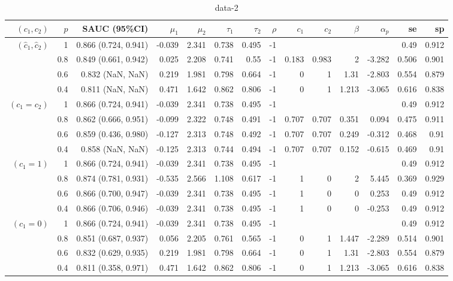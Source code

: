 \begin{table}

\caption{data-2}
\centering
\begin{tabular}[t]{rrrrrrrrrrrrrr}
\toprule
$(c_1, c_2)$ & $p$ & SAUC (95\%CI) & $\mu_1$ & $\mu_2$ & $\tau_1$ & $\tau_2$ & $\rho$ & $c_1$ & $c_2$ & $\beta$ & $\alpha_p$ & se & sp\\
\midrule
$(\hat{c}_1, \hat{c}_2)$ & 1 & 0.866 (0.724, 0.941) & -0.039 & 2.341 & 0.738 & 0.495 & -1 &  &  &  &  & 0.49 & 0.912\\
 & 0.8 & 0.849 (0.661, 0.942) & 0.025 & 2.208 & 0.741 & 0.55 & -1 & 0.183 & 0.983 & 2 & -3.282 & 0.506 & 0.901\\
 & 0.6 & 0.832 (NaN, NaN) & 0.219 & 1.981 & 0.798 & 0.664 & -1 & 0 & 1 & 1.31 & -2.803 & 0.554 & 0.879\\
 & 0.4 & 0.811 (NaN, NaN) & 0.471 & 1.642 & 0.862 & 0.806 & -1 & 0 & 1 & 1.213 & -3.065 & 0.616 & 0.838\\
\addlinespace
$(c_1 = c_2)$ & 1 & 0.866 (0.724, 0.941) & -0.039 & 2.341 & 0.738 & 0.495 & -1 &  &  &  &  & 0.49 & 0.912\\
 & 0.8 & 0.862 (0.666, 0.951) & -0.099 & 2.322 & 0.748 & 0.491 & -1 & 0.707 & 0.707 & 0.351 & 0.094 & 0.475 & 0.911\\
 & 0.6 & 0.859 (0.436, 0.980) & -0.127 & 2.313 & 0.748 & 0.492 & -1 & 0.707 & 0.707 & 0.249 & -0.312 & 0.468 & 0.91\\
 & 0.4 & 0.858 (NaN, NaN) & -0.125 & 2.313 & 0.744 & 0.494 & -1 & 0.707 & 0.707 & 0.152 & -0.615 & 0.469 & 0.91\\
\addlinespace
$(c_1 = 1)$ & 1 & 0.866 (0.724, 0.941) & -0.039 & 2.341 & 0.738 & 0.495 & -1 &  &  &  &  & 0.49 & 0.912\\
 & 0.8 & 0.874 (0.781, 0.931) & -0.535 & 2.566 & 1.108 & 0.617 & -1 & 1 & 0 & 2 & 5.445 & 0.369 & 0.929\\
 & 0.6 & 0.866 (0.700, 0.947) & -0.039 & 2.341 & 0.738 & 0.495 & -1 & 1 & 0 & 0 & 0.253 & 0.49 & 0.912\\
 & 0.4 & 0.866 (0.706, 0.946) & -0.039 & 2.341 & 0.738 & 0.495 & -1 & 1 & 0 & 0 & -0.253 & 0.49 & 0.912\\
\addlinespace
$(c_1 = 0)$ & 1 & 0.866 (0.724, 0.941) & -0.039 & 2.341 & 0.738 & 0.495 & -1 &  &  &  &  & 0.49 & 0.912\\
 & 0.8 & 0.851 (0.687, 0.937) & 0.056 & 2.205 & 0.761 & 0.565 & -1 & 0 & 1 & 1.447 & -2.289 & 0.514 & 0.901\\
 & 0.6 & 0.832 (0.629, 0.935) & 0.219 & 1.981 & 0.798 & 0.664 & -1 & 0 & 1 & 1.31 & -2.803 & 0.554 & 0.879\\
 & 0.4 & 0.811 (0.358, 0.971) & 0.471 & 1.642 & 0.862 & 0.806 & -1 & 0 & 1 & 1.213 & -3.065 & 0.616 & 0.838\\
\bottomrule
\end{tabular}
\end{table}
